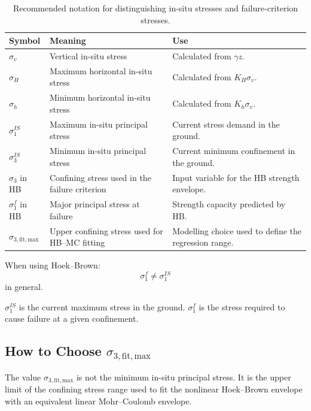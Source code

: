 \documentclass[a4paper,12pt]{article}
\begin{document}
\begin{table}[H]
\centering
\small
\begin{tabularx}{\textwidth}{l l Y}
\toprule
\textbf{Symbol} & \textbf{Meaning} & \textbf{Use} \\
\midrule
\(\sigma_v\) & Vertical in-situ stress & Calculated from \(\gamma z\). \\
\(\sigma_H\) & Maximum horizontal in-situ stress & Calculated from \(K_H\sigma_v\). \\
\(\sigma_h\) & Minimum horizontal in-situ stress & Calculated from \(K_h\sigma_v\). \\
\(\sigma_1^{IS}\) & Maximum in-situ principal stress & Current stress demand in the ground. \\
\(\sigma_3^{IS}\) & Minimum in-situ principal stress & Current minimum confinement in the ground. \\
\(\sigma_3\) in HB & Confining stress used in the failure criterion & Input variable for the HB strength envelope. \\
\(\sigma_1^f\) in HB & Major principal stress at failure & Strength capacity predicted by HB. \\
\(\sigma_{3,\mathrm{fit,max}}\) & Upper confining stress used for HB--MC fitting & Modelling choice used to define the regression range. \\
\bottomrule
\end{tabularx}
\caption{Recommended notation for distinguishing in-situ stresses and failure-criterion stresses.}
\end{table}

\begin{warnbox}
When using Hoek--Brown:
\[
\sigma_1^f \neq \sigma_1^{IS}
\]
in general.

\(\sigma_1^{IS}\) is the current maximum stress in the ground.  
\(\sigma_1^f\) is the stress required to cause failure at a given confinement.
\end{warnbox}

\subsection{How to Choose \(\sigma_{3,\mathrm{fit,max}}\)}

The value \(\sigma_{3,\mathrm{fit,max}}\) is not the minimum in-situ principal stress.
It is the upper limit of the confining stress range used to fit the nonlinear
Hoek--Brown envelope with an equivalent linear Mohr--Coulomb envelope.
\end{document}

